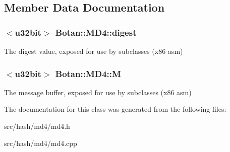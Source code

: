 \subsection{Member Data Documentation}
\hypertarget{classBotan_1_1MD4_a7bd4eab380df0076c137fefdbedf2121}{
\subsubsection[{digest}]{$<${\bf u32bit}$>$ Botan\-::\-M\-D4\-::digest\hspace{0.3cm}{\ttfamily [protected]}}}\label{classBotan_1_1MD4_a7bd4eab380df0076c137fefdbedf2121}
The digest value, exposed for use by subclasses (x86 asm) \hypertarget{classBotan_1_1MD4_a5a6cd85b1feadc4fc9b48ee83b421106}{
\subsubsection[{M}]{$<${\bf u32bit}$>$ Botan\-::\-M\-D4\-::\-M\hspace{0.3cm}{\ttfamily [protected]}}}\label{classBotan_1_1MD4_a5a6cd85b1feadc4fc9b48ee83b421106}
The message buffer, exposed for use by subclasses (x86 asm) 

The documentation for this class was generated from the following files\-:\begin{DoxyCompactItemize}
\item 
src/hash/md4/md4.\-h\item 
src/hash/md4/md4.\-cpp\end{DoxyCompactItemize}
